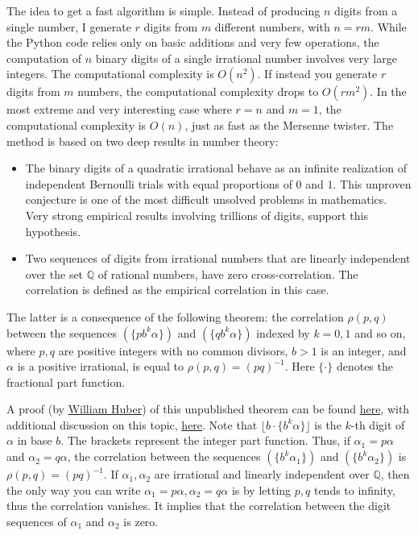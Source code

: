 \documentclass[oneside,10pt]{book}
\begin{document}
The idea to get a fast algorithm is simple. Instead of producing $n$ digits from a single number, I generate
 $r$ digits from $m$ different numbers, with $n=rm$. While the Python code relies only on basic additions and very
 few operations, the computation of $n$ binary digits of a single irrational number involves very large integers. The
\textcolor{index}{computational  complexity} is $O(n^2)$. If instead you
 generate $r$ digits from $m$ numbers, the computational complexity drops to $O(rm^2)$. In the most extreme and very interesting case where $r=n$ and $m=1$, the computational complexity is $O(n)$, just as fast as the Mersenne twister.
The method is based on two deep results in number theory:
\begin{itemize}
\item The binary digits of a quadratic irrational behave as an infinite realization of independent Bernoulli trials with equal proportions of $0$ and $1$. This unproven conjecture is one of the most difficult unsolved problems in mathematics. Very strong empirical results involving trillions of digits, support this hypothesis.
\item Two sequences of digits from irrational numbers that are linearly independent over the set
$\mathbb{Q}$ of rational numbers,
 have zero cross-correlation. The correlation is defined as the empirical correlation in this case.
\end{itemize}
The latter is a consequence of the following theorem: the correlation $\rho(p,q)$ between the sequences
 $(\{p b^k\alpha\})$ and $(\{q b^k\alpha\})$ indexed by $k=0,1$ and so on, where $p,q$ are positive integers with no common divisors, $b > 1$ is an integer, and $\alpha$ is a positive irrational, is equal to $\rho(p,q) = (pq)^{-1}$. Here $\{\cdot\}$ denotes the fractional part function.

A proof (by \href{https://www.analysisandinference.com/team/william-a-huber-phd}{William Huber}) of this unpublished theorem  can be found \href{https://stats.stackexchange.com/questions/422354/correlations-between-two-sequences-of-irrational-numbers}{here}, with additional discussion on this topic, \href{https://stats.stackexchange.com/questions/450922/cross-correlations-in-digit-distributions}{here}.
Note that $\lfloor b \cdot \{b^k \alpha\}\rfloor$ is the $k$-th digit of $\alpha$ in base $b$. The brackets represent the integer part function. Thus, if $\alpha_1=p\alpha$ and $\alpha_2=q\alpha$, the correlation between the sequences
 $(\{b^k \alpha_1\})$ and $(\{b^k \alpha_2\})$ is $\rho(p,q)=(pq)^{-1}$. If $\alpha_1,\alpha_2$ are irrational and
 linearly independent over $\mathbb{Q}$,
 then the only way you can write $\alpha_1=p\alpha,\alpha_2=q\alpha$ is by letting $p,q$ tends to infinity, thus the correlation vanishes. It implies that the correlation between the digit sequences of $\alpha_1$ and $\alpha_2$ is zero.
\end{document}
